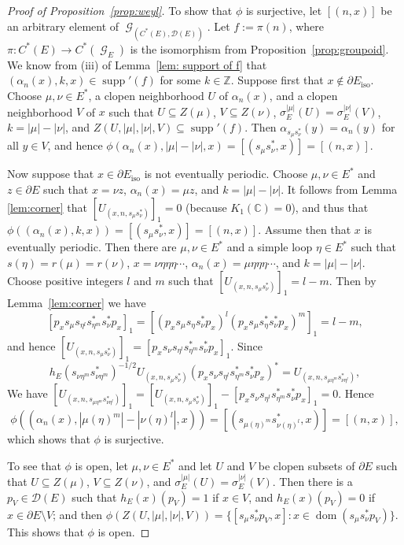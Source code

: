 \documentclass[12pt, a4paper]{amsart}
\numberwithin{equation}{section}
\theoremstyle{definition}
\theoremstyle{remark}
\begin{document}
\begin{proof}[Proof of Proposition~\ref{prop:weyl}]
To show that $\phi$ is surjective, let $[(n,x)]$ be an arbitrary 
element of ${\operatorname{\mathcal{G}}}_{(C^*(E),\mathcal{D}(E))}$. Let $f:=\pi(n)$, where 
$\pi:C^*(E)\to C^*({\operatorname{\mathcal{G}}}_E)$ is the isomorphism from 
Proposition~\ref{prop:groupoid}. We know from (iii) of Lemma~\ref{lem: 
support of f} that $(\alpha_n(x),k,x)\in{\operatorname{supp}}'(f)$ for some $k\in{\mathbb{Z}}$. Suppose 
first that 
$x\notin\partial E_{{\operatorname{iso}}}$.  Choose $\mu,\nu\in E^*$, a clopen neighborhood $U$ of 
$\alpha_n(x)$, and a clopen neighborhood $V$ of $x$ such that $U\subseteq 
Z(\mu)$, $V\subseteq Z(\nu)$, $\sigma_E^{|\mu|}(U)=\sigma_E^{|\nu|}(V)$, $k=|\mu|-|\nu|$, and 
$Z(U,|\mu|,|\nu|,V)\subseteq{\operatorname{supp}}'(f)$. Then $\alpha_{s_\mu s_\nu^*}(y)=\alpha_n(y)$ 
for all $y\in V$, and hence $\phi(\alpha_n(x),|\mu|-|\nu|,x)=[(s_\mu 
s_\nu^*,x)]=[(n,x)]$. 

Now suppose that $x\in\partial E_{{\operatorname{iso}}}$ is not eventually periodic. Choose $\mu,\nu\in E^*$ and $z\in\partial E$ such that $x=\nu z$, 
$\alpha_n(x)=\mu z$, and $k=|\mu|-|\nu|$. It follows from Lemma 
\ref{lem:corner} that $[U_{(x,n,s_{\mu}s_\nu^*)}]_1=0$ (because $K_1({\mathbb{C}})=0$), and thus that 
$\phi((\alpha_n(x),k,x))=[(s_\mu s_\nu^*,x)]=[(n,x)]$. Assume then that $x$ is 
eventually periodic. Then there are $\mu,\nu\in E^*$ and a simple loop 
$\eta\in E^*$ such that $s(\eta)=r(\mu)=r(\nu)$, $x=\nu\eta\eta\eta\cdots$, 
$\alpha_n(x)=\mu\eta\eta\eta\cdots$, and $k=|\mu|-|\nu|$. Choose positive 
integers $l$ and $m$ such that $[U_{(x,n,s_{\mu}s_\nu^*)}]_1=l-m$. Then by 
Lemma~\ref{lem:corner} we have
\[
[p_xs_\mu 
s_{\eta^l}s_{\eta^m}^*s_\nu^*p_x]_1=[(p_xs_\mu s_\eta s_\nu^*p_x)^l(p_xs_\mu 
s_\eta^*s_\nu^*p_x)^m]_1=l-m,
\]
and hence $[U_{(x,n,s_{\mu}s_\nu^*)}]_1=[p_xs_\nu 
s_{\eta^l}s_{\eta^m}^*s_\nu^*p_x]_1$. Since 
\[
h_E(s_{\nu\eta^m}s_{\nu\eta^m}^*)^{-1/2}U_{(x,n,s_\mu s_\nu^*)}(p_xs_\nu 
s_{\eta^l}s_{\eta^m}^*s_\nu^*p_x)^*=U_{(x,n,s_{\mu\eta^m}s_{\nu\eta^l}^*)},
\]
We have $[U_{(x,n,s_{\mu\eta^m}s_{\nu\eta^l}^*)}]_1=[U_{(x,n,s_\mu 
s_\nu^*)}]_1-[p_xs_\nu 
s_{\eta^l}s_{\eta^m}^*s_\nu^*p_x]_1=0.$ Hence 
\[
\phi((\alpha_n(x),|\mu 
(\eta)^m|-|\nu 
(\eta)^l|,x))=[(s_{\mu(\eta)^m}s_{\nu(\eta)^l}^*,x)]=[(n,x)],
\]
which shows 
that 
$\phi$ is surjective. 

To see that $\phi$ is open, let $\mu,\nu\in E^*$ and let $U$ and $V$ 
be clopen subsets of $\partial E$ such that $U\subseteq Z(\mu)$, $V\subseteq 
Z(\nu)$, and $\sigma_E^{|\mu|}(U)=\sigma_E^{|\nu|}(V)$. Then there is a 
$p_V\in\mathcal{D}(E)$ such that $h_E(x)(p_V)=1$ if $x\in V$, and 
$h_E(x)(p_V)=0$ if $x\in\partial E\setminus V$; and then 
$\phi(Z(U,|\mu|,|\nu|,V))=\{[s_\mu s_\nu^* p_V,x]:x\in{{\operatorname{dom}}}(s_\mu s_\nu^* 
p_V)\}$. This shows that $\phi$ is open.
	

\end{proof}
\end{document}
